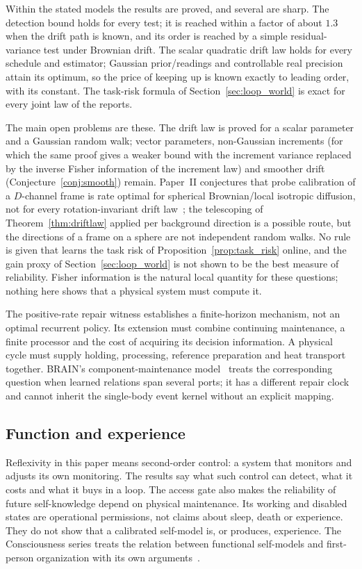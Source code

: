 \documentclass[12pt]{article}
\theoremstyle{definition}
\begin{document}
Within the stated models the results are proved, and several are sharp. The detection bound holds for every test; it is reached within a factor of about $1.3$ when the drift path is known, and its order is reached by a simple residual-variance test under Brownian drift. The scalar quadratic drift law holds for every schedule and estimator; Gaussian prior/readings and controllable real precision attain its optimum, so the price of keeping up is known exactly to leading order, with its constant. The task-risk formula of Section~\ref{sec:loop_world} is exact for every joint law of the reports.

The main open problems are these. The drift law is proved for a scalar parameter and a Gaussian random walk; vector parameters, non-Gaussian increments (for which the same proof gives a weaker bound with the increment variance replaced by the inverse Fisher information of the increment law) and smoother drift (Conjecture~\ref{conj:smooth}) remain. Paper~II conjectures that probe calibration of a $D$-channel frame is rate optimal for spherical Brownian/local isotropic diffusion, not for every rotation-invariant drift law~\cite{Liu2026TDOME_II}; the telescoping of Theorem~\ref{thm:driftlaw} applied per background direction is a possible route, but the directions of a frame on a sphere are not independent random walks. No rule is given that learns the task risk of Proposition~\ref{prop:task_risk} online, and the gain proxy of Section~\ref{sec:loop_world} is not shown to be the best measure of reliability. Fisher information is the natural local quantity for these questions; nothing here shows that a physical system must compute it.

The positive-rate repair witness establishes a finite-horizon mechanism,
not an optimal recurrent policy. Its extension must combine continuing
maintenance, a finite processor and the cost of acquiring its decision
information. A physical cycle must supply holding, processing, reference
preparation and heat transport together. BRAIN's component-maintenance
model~\cite{Liu2026BRAIN} treats the corresponding question when learned
relations span several ports; it has a different repair clock and
cannot inherit the single-body event kernel without an explicit mapping.

\subsection{Function and experience}
\label{subsec:function}

Reflexivity in this paper means second-order control: a system that monitors and adjusts its own monitoring. The results say what such control can detect, what it costs and what it buys in a loop. The access gate also makes the reliability of future self-knowledge depend on physical maintenance. Its working and disabled states are operational permissions, not claims about sleep, death or experience. They do not show that a calibrated self-model is, or produces, experience. The Consciousness series treats the relation between functional self-models and first-person organization with its own arguments~\cite{Liu2026CIII}.
\end{document}
